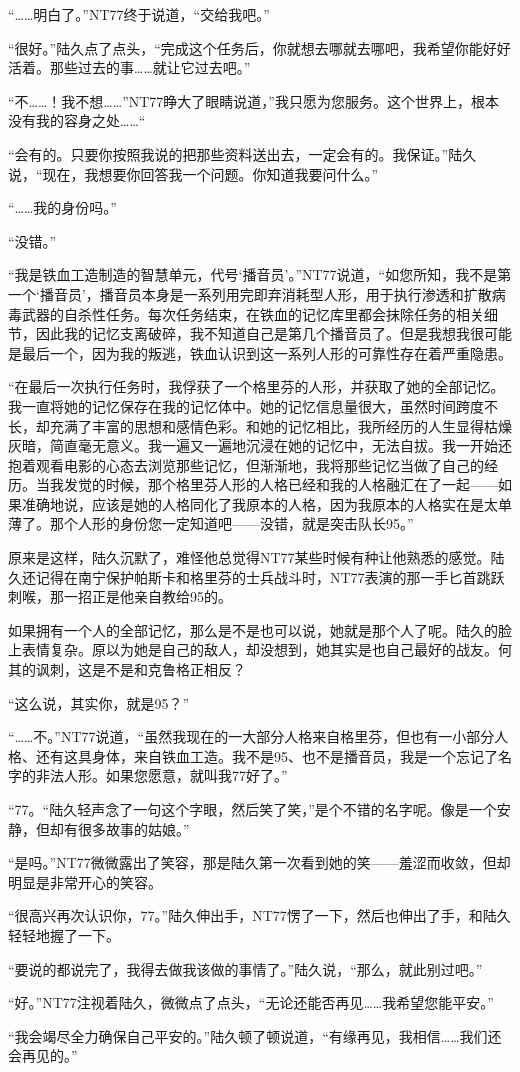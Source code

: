 “……明白了。”NT77终于说道，“交给我吧。”

“很好。”陆久点了点头，“完成这个任务后，你就想去哪就去哪吧，我希望你能好好活着。那些过去的事……就让它过去吧。”

“不……！我不想……”NT77睁大了眼睛说道，”我只愿为您服务。这个世界上，根本没有我的容身之处……“

“会有的。只要你按照我说的把那些资料送出去，一定会有的。我保证。”陆久说，“现在，我想要你回答我一个问题。你知道我要问什么。”

“……我的身份吗。”

“没错。”

“我是铁血工造制造的智慧单元，代号‘播音员’。”NT77说道，“如您所知，我不是第一个‘播音员’，播音员本身是一系列用完即弃消耗型人形，用于执行渗透和扩散病毒武器的自杀性任务。每次任务结束，在铁血的记忆库里都会抹除任务的相关细节，因此我的记忆支离破碎，我不知道自己是第几个播音员了。但是我想我很可能是最后一个，因为我的叛逃，铁血认识到这一系列人形的可靠性存在着严重隐患。

“在最后一次执行任务时，我俘获了一个格里芬的人形，并获取了她的全部记忆。我一直将她的记忆保存在我的记忆体中。她的记忆信息量很大，虽然时间跨度不长，却充满了丰富的思想和感情色彩。和她的记忆相比，我所经历的人生显得枯燥灰暗，简直毫无意义。我一遍又一遍地沉浸在她的记忆中，无法自拔。我一开始还抱着观看电影的心态去浏览那些记忆，但渐渐地，我将那些记忆当做了自己的经历。当我发觉的时候，那个格里芬人形的人格已经和我的人格融汇在了一起——如果准确地说，应该是她的人格同化了我原本的人格，因为我原本的人格实在是太单薄了。那个人形的身份您一定知道吧——没错，就是突击队长95。”

原来是这样，陆久沉默了，难怪他总觉得NT77某些时候有种让他熟悉的感觉。陆久还记得在南宁保护帕斯卡和格里芬的士兵战斗时，NT77表演的那一手匕首跳跃刺喉，那一招正是他亲自教给95的。

如果拥有一个人的全部记忆，那么是不是也可以说，她就是那个人了呢。陆久的脸上表情复杂。原以为她是自己的敌人，却没想到，她其实是也自己最好的战友。何其的讽刺，这是不是和克鲁格正相反？

“这么说，其实你，就是95？”

“……不。”NT77说道，“虽然我现在的一大部分人格来自格里芬，但也有一小部分人格、还有这具身体，来自铁血工造。我不是95、也不是播音员，我是一个忘记了名字的非法人形。如果您愿意，就叫我77好了。”

“77。“陆久轻声念了一句这个字眼，然后笑了笑，”是个不错的名字呢。像是一个安静，但却有很多故事的姑娘。”

“是吗。”NT77微微露出了笑容，那是陆久第一次看到她的笑——羞涩而收敛，但却明显是非常开心的笑容。

“很高兴再次认识你，77。”陆久伸出手，NT77愣了一下，然后也伸出了手，和陆久轻轻地握了一下。

“要说的都说完了，我得去做我该做的事情了。”陆久说，“那么，就此别过吧。”

“好。”NT77注视着陆久，微微点了点头，“无论还能否再见……我希望您能平安。”

“我会竭尽全力确保自己平安的。”陆久顿了顿说道，“有缘再见，我相信……我们还会再见的。”